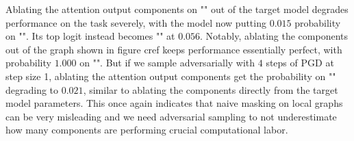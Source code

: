 \documentclass{article}
\begin{document}
Ablating the attention output components on "" out of the target model degrades performance on the task severely, with the model now putting $0.015$ probability on "\code{<}". Its top logit instead becomes "" at $0.056$. Notably, ablating the components out of the graph shown in figure cref keeps performance essentially perfect, with probability $1.000$ on "\code{<}". But if we sample adversarially with $4$ steps of PGD at step size 1, ablating the attention output components get the probability on "\code{<}" degrading to $0.021$, similar to ablating the components directly from the target model parameters. This once again indicates that naive masking on local graphs can be very misleading and we need adversarial sampling to not underestimate how many components are performing crucial computational labor.
\end{document}
